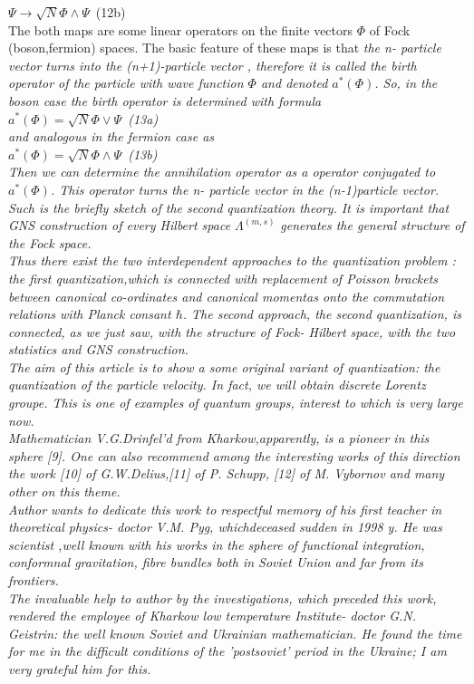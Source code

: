 \documentclass[a4paper,12pt] {article}
\begin{document}
$ \Psi \to \sqrt N \Phi \wedge \Psi $\ (12b)
\\ The both maps are some linear operators on the finite vectors  $\Phi$ of Fock (boson,fermion) spaces.
 The basic feature of these maps is that  \it the \rm  n- \it particle vector \it turns into the \rm  (n+1)-\it particle
 vector , \rm therefore it is called \it the  birth operator of  the particle with wave function $\Phi$ \rm  and
 denoted $a^*(\Phi )$. So, in the boson case the birth operator is determined with formula
\\$a^*(\Phi ) = \sqrt N\Phi \vee \Psi $\ (13a)\\ and analogous in the fermion case as
\\$a^*(\Phi ) = \sqrt N\Phi \wedge \Psi $\ (13b)
\\ Then we can determine the annihilation operator as a operator conjugated to  $a^*(\Phi )$.
 \it This operator turns the  \rm n- \it particle vector in the \rm (n-1)\it  particle vector.
\\ \rm Such is the briefly  sketch of the second quantization theory. It is important that GNS construction of
every Hilbert space   $\Lambda^ {(m,s)}$   generates the general structure of the Fock space.
\\ Thus there exist the two interdependent approaches to the quantization problem : \it the first
 quantization,\rm which is connected with replacement of Poisson  brackets between canonical
 co-ordinates and canonical momentas  onto the commutation relations with Planck consant $\hbar$. The
 second  approach,
\it the second quantization, \rm is  connected, as we just saw, with the structure of Fock- Hilbert space,
 with the two statistics and  GNS construction.\\
The aim of this article is to show a some original variant of quantization: the quantization of the
\it  particle   velocity. \rm In fact, we will obtain   \it discrete Lorentz groupe. \rm This is one of examples
of  \it quantum \rm  groups,  interest to which is very large now.
\\ Mathematician V.G.Drinfel'd from Kharkow,apparently, is a pioneer in this sphere [9]. One can also
recommend among the  interesting works of this direction the work [10] of G.W.Delius,[11] of P. Schupp,
 [12] of M. Vybornov and many other on this theme.\\
Author wants to   dedicate this work to respectful memory of his first teacher in theoretical physics-
doctor V.M. Pyg, whichdeceased sudden in 1998 y. He was  scientist ,well known with his works in the  sphere of functional integration, conformnal gravitation, fibre bundles both in Soviet Union and far from its frontiers.\\
The invaluable help to author by the investigations, which preceded this work, rendered the employee
 of  Kharkow low temperature Institute- doctor G.N. Geistrin: the well known Soviet and Ukrainian
mathematician. He found the time for me in the difficult conditions of  the 'postsoviet' period in the
 Ukraine; I am very grateful him for this.
\end{document}
